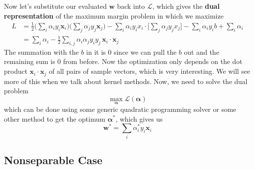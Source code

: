     Now let's substitute our evaluated $\mathbf{w}$ back into $\mathcal{L}$, which gives the \textbf{dual representation} of the maximum margin problem in which we maximize  
    \begin{align*} 
        L & = \frac{1}{2} \bigg( \sum_i \alpha_i y_i \mathbf{x}_i \bigg) \bigg( \sum_j \alpha_j y_j \mathbf{x}_j \bigg) - \sum_{i} \alpha_i y_i x_i \cdot \bigg[ \sum_j \alpha_j y_j x_j \bigg] - \sum_i \alpha_i y_i b + \sum_i \alpha_i \\ 
          & = \sum_i \alpha_i - \frac{1}{2} \sum_{i, j} \alpha_i \alpha_j y_i y_j \, \mathbf{x}_i \cdot \mathbf{x}_j 
    \end{align*}
    The summation with the $b$ in it is $0$ since we can pull the $b$ out and the remaining sum is $0$ from before. Now the optimization only depends on the dot product $\mathbf{x}_i \cdot \mathbf{x}_j$ of all pairs of sample vectors, which is very interesting. We will see more of this when we talk about kernel methods. Now, we need to solve the dual problem 
    \[\max_{\boldsymbol{\alpha}} \mathcal{L}(\boldsymbol{\alpha})\]
    which can be done using some generic quadratic programming solver or some other method to get the optimum $\boldsymbol{\alpha}^\ast$, which gives us 
    \[\mathbf{w}^\ast = \sum_i \alpha_i^\ast y_i \mathbf{x}_i\]


  \subsection{Nonseparable Case} 


